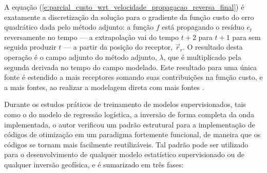   A equação (\ref{e:parcial_custo_wrt_velocidade_propagacao_reversa_final}) é exatamente a discretização da solução para o gradiente da função custo do erro quadrático dada pelo método adjunto: a função $f$ está propagando o resíduo $e_t$ reversamente no tempo --- a extrapolação vai do tempo $t+2$ para $t+1$ para sem seguida produzir $t$ --- a partir da posição do receptor, $\vec{r}_r$. O resultado desta operação é o campo adjunto do método adjunto, $\lambda$, que é multiplicado pela segunda derivada no tempo do campo modelado. Este resultado para uma única fonte é estendido a mais receptores somando suas contribuições na função custo, e a mais fontes, ao realizar a modelagem direta com mais fontes .


 \label{a:guia_treinamento}

    Durante os estudos práticos de treinamento de modelos supervisionados, tais como o do modelo de regressão logística, a inversão de forma completa da onda implementada, o autor verificou um padrão estrutural para a implementação de códigos de otimização em um paradigma fortemente funcional, de maneira que os códigos se tornam mais facilmente reutilizáveis. Tal padrão pode ser utilizado para o desenvolvimento de qualquer modelo estatístico supervisionado ou de qualquer inversão geofísica, e é sumarizado em três fases:

